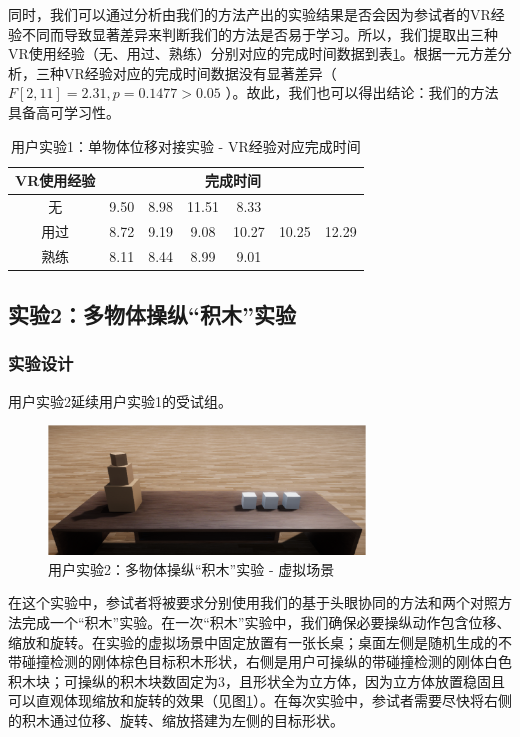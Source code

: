 同时，我们可以通过分析由我们的方法产出的实验结果是否会因为参试者的VR经验不同而导致显著差异来判断我们的方法是否易于学习。所以，我们提取出三种VR使用经验（无、用过、熟练）分别对应的完成时间数据到表\ref{table-4-4}。根据一元方差分析，三种VR经验对应的完成时间数据没有显著差异（ $F[2, 11] = 2.31, p = 0.1477 > 0.05$ ）。故此，我们也可以得出结论：我们的方法具备高可学习性。

\begin{table}[t!]
\centering
\caption{用户实验1：单物体位移对接实验 - VR经验对应完成时间}
\begin{tabular}{ccccccc}
\toprule
\textbf{VR使用经验} & \multicolumn{6}{c}{\textbf{完成时间}} \\
\midrule
无 & 9.50 & 8.98 & 11.51 & 8.33  &       &       \\
用过   & 8.72 & 9.19 & 9.08  & 10.27 & 10.25 & 12.29 \\
熟练   & 8.11 & 8.44 & 8.99  & 9.01  &       &       \\
\bottomrule
\end{tabular}
\label{table-4-4}
\end{table}

\subsection{实验2：多物体操纵“积木”实验}

\subsubsection{实验设计}

用户实验2延续用户实验1的受试组。

\begin{figure}[b!]
    \centering
    \includegraphics[width=0.75\textwidth]{figure/user-study-2-screenshot.png}
    \caption{用户实验2：多物体操纵“积木”实验 - 虚拟场景}
    \label{fig-4-3}
\end{figure}

在这个实验中，参试者将被要求分别使用我们的基于头眼协同的方法和两个对照方法完成一个“积木”实验。在一次“积木”实验中，我们确保必要操纵动作包含位移、缩放和旋转。在实验的虚拟场景中固定放置有一张长桌；桌面左侧是随机生成的不带碰撞检测的刚体棕色目标积木形状，右侧是用户可操纵的带碰撞检测的刚体白色积木块；可操纵的积木块数固定为3，且形状全为立方体，因为立方体放置稳固且可以直观体现缩放和旋转的效果（见图\ref{fig-4-3}）。在每次实验中，参试者需要尽快将右侧的积木通过位移、旋转、缩放搭建为左侧的目标形状。

